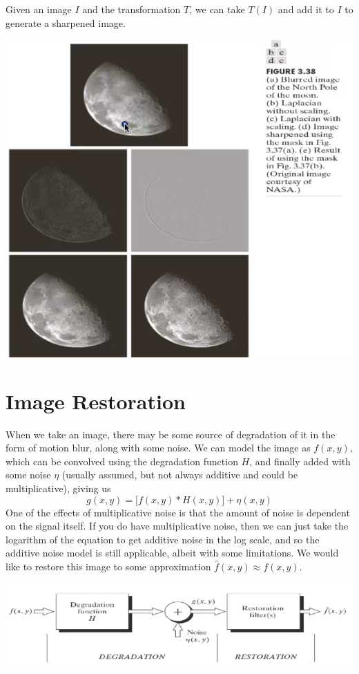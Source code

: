 \documentclass{article}
\begin{document}
    Given an image $I$ and the transformation $T$, we can take $T(I)$ and add it to $I$ to generate a sharpened image. 
    \begin{center}
        \includegraphics[scale=0.4]{img/laplacian_unsharpen.png}
    \end{center}

\section{Image Restoration}

    When we take an image, there may be some source of degradation of it in the form of motion blur, along with some noise. We can model the image as $f(x, y)$, which can be convolved using the degradation function $H$, and finally added with some noise $\eta$ (usually assumed, but not always additive and could be multiplicative), giving us 
    \[g(x, y) = \big[ f(x, y) \ast H(x, y) \big] + \eta(x, y)\]
    One of the effects of multiplicative noise is that the amount of noise is dependent on the signal itself. If you do have multiplicative noise, then we can just take the logarithm of the equation to get additive noise in the log scale, and so the additive noise model is still applicable, albeit with some limitations. We would like to restore this image to some approximation $\hat{f}(x, y) \approx f(x, y)$. 
    \begin{center}
        \includegraphics[scale=0.3]{img/degradation_restoration.png}
    \end{center}
\end{document}
